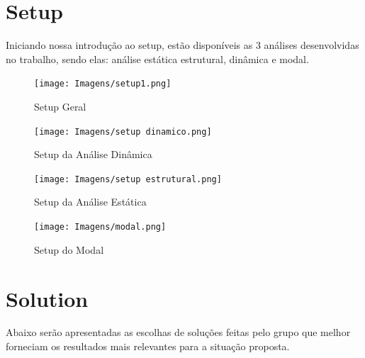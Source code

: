 \documentclass[deposito, acronym, symbols]{fei}
\begin{document}
 \newpage
 
\section{Setup}
Iniciando nossa introdução ao setup, estão disponíveis as 3 análises desenvolvidas no trabalho, sendo elas: análise estática estrutural, dinâmica e modal.

\begin{figure}[!htb]
 \centering
    \caption{Setup Geral}
    \texttt{[image: Imagens/setup1.png]}
    \label{fig: Setup do Workbench}
 \end{figure}
 
 \begin{figure}[!htb]
 \centering
    \caption{Setup da Análise Dinâmica}
    \texttt{[image: Imagens/setup dinamico.png]}
    \label{fig: Setup do Workbench}
 \end{figure}
 
 \begin{figure}[!htb]
 \centering
    \caption{Setup da Análise Estática}
    \texttt{[image: Imagens/setup estrutural.png]}
    \label{fig: Setup do Workbench}
 \end{figure}
 
\begin{figure}[!htb]
 \centering
    \caption{Setup do Modal}
    \texttt{[image: Imagens/modal.png]}
    \label{fig: Setup do Workbench}
 \end{figure}
 
 \newpage
 
\section{Solution}
Abaixo serão apresentadas as escolhas de soluções feitas pelo grupo que melhor forneciam os resultados mais relevantes para a situação proposta.
\end{document}

